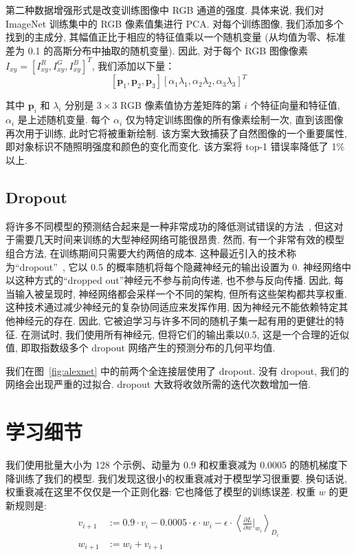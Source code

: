 \documentclass{article} %
\begin{document}
第二种数据增强形式是改变训练图像中 RGB 通道的强度. 具体来说, 我们对 ImageNet 训练集中的 RGB 像素值集进行 PCA. 对每个训练图像, 我们添加多个找到的主成分, 其幅值正比于相应的特征值乘以一个随机变量 (从均值为零、标准差为 0.1 的高斯分布中抽取的随机变量). 因此, 对于每个 RGB 图像像素 $I_{xy} = [I^R_{xy}, I^G_{xy}, I^B_{xy}]^T$, 我们添加以下量：
\[
[\mathbf{p}_1, \mathbf{p}_2, \mathbf{p}_3][\alpha_1\lambda_1, \alpha_2\lambda_2, \alpha_3\lambda_3]^T
\]

其中 $\mathbf{p}_i$ 和 $\lambda_i$ 分别是 $3 \times 3$ RGB 像素值协方差矩阵的第 $i$ 个特征向量和特征值, $\alpha_i$ 是上述随机变量. 每个 $\alpha_i$ 仅为特定训练图像的所有像素绘制一次, 直到该图像再次用于训练, 此时它将被重新绘制. 该方案大致捕获了自然图像的一个重要属性, 即对象标识不随照明强度和颜色的变化而变化. 该方案将 top-1 错误率降低了 1\% 以上.
\vspace{-1mm}
\subsection{Dropout}
\vspace{-2ex}
将许多不同模型的预测结合起来是一种非常成功的降低测试错误的方法~\cite{bell2007, breiman2001}, 但这对于需要几天时间来训练的大型神经网络可能很昂贵. 然而, 有一个非常有效的模型组合方法, 在训练期间只需要大约两倍的成本. 这种最近引入的技术称为“dropout”~\cite{hinton2012}, 它以 0.5 的概率随机将每个隐藏神经元的输出设置为 0. 神经网络中以这种方式的“dropped out”神经元不参与前向传递, 也不参与反向传播. 因此, 每当输入被呈现时, 神经网络都会采样一个不同的架构, 但所有这些架构都共享权重. 这种技术通过减少神经元的复杂协同适应来发挥作用, 因为神经元不能依赖特定其他神经元的存在. 因此, 它被迫学习与许多不同的随机子集一起有用的更健壮的特征. 在测试时, 我们使用所有神经元, 但将它们的输出乘以0.5, 这是一个合理的近似值, 即取指数级多个 dropout 网络产生的预测分布的几何平均值.

我们在图~\ref{fig:alexnet} 中的前两个全连接层使用了 dropout. 没有 dropout, 我们的网络会出现严重的过拟合. dropout 大致将收敛所需的迭代次数增加一倍.

\vspace{-1mm}
\section{学习细节}
\vspace{-2ex}
我们使用批量大小为 128 个示例、动量为 0.9 和权重衰减为 0.0005 的随机梯度下降训练了我们的模型. 我们发现这很小的权重衰减对于模型学习很重要. 换句话说, 权重衰减在这里不仅仅是一个正则化器: 它也降低了模型的训练误差. 权重 $w$ 的更新规则是:
\begin{align*}
v_{i+1} &:= 0.9 \cdot v_i - 0.0005 \cdot \epsilon \cdot w_i - \epsilon \cdot\left\langle  \frac{\partial L}{\partial w}|_{w_i} \right\rangle_{D_i} \\
w_{i+1} &:= w_i + v_{i+1}
\end{align*}
\end{document}
